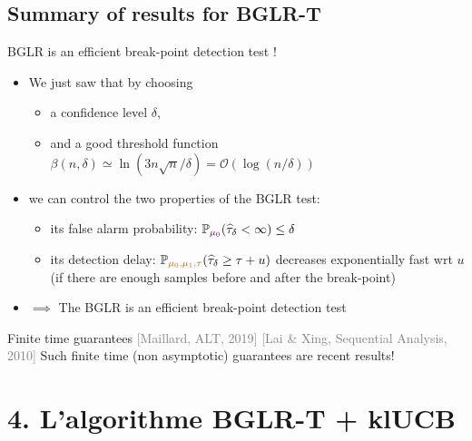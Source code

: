 \documentclass[11pt,french,ignorenonframetext,]{beamer}
\providecommand{\tightlist}{%
  \setlength{\itemsep}{0pt}\setlength{\parskip}{0pt}}
\begin{document}
\subsection{\hfill{}Summary of results for BGLR-T\hfill{}}

\begin{frame}{BGLR is an efficient break-point detection test \dCooley{} !}

  \begin{itemize}
    \item
    We just saw that by choosing
    \begin{itemize}\tightlist
      \item
      a confidence level $\delta$,
      \item
      and a good threshold function $\beta(n,\delta) \simeq \ln(3n \sqrt{n}/\delta) = \mathcal{O}(\log(n/\delta))$
    \end{itemize}
    \pause
    \item
    we can control the two properties of the BGLR test:
    \begin{itemize}\tightlist
      \item
        its \alert{false alarm probability}:
        $\mathbb{P}_{\textcolor{darkpurple}{\mu_0}}(\widehat{\tau}_\delta < \infty) \leq \delta$
      \item
        its \alert{detection delay}:
        $\mathbb{P}_{\textcolor{gold}{\mu_0,\mu_1,\tau}} (\widehat{\tau}_{\delta} \geq \tau + u)$ decreases exponentially fast wrt $u$
        (if there are enough samples before and after the break-point)
    \end{itemize}

    \item
    $\implies$ The BGLR is an efficient break-point detection test \dCooley{}
  \end{itemize}

  \pause
  \begin{block}{Finite time guarantees \dCooley{} \hfill{} \tiny{\textcolor{gray}{[Maillard, ALT, 2019]} \textcolor{gray}{[Lai \& Xing, Sequential Analysis, 2010]}}}
    Such \alert{finite time} (non asymptotic) guarantees are recent results!
  \end{block}

\end{frame}

\section{\hfill{}4. L'algorithme BGLR-T + klUCB\hfill{}}
\end{document}

